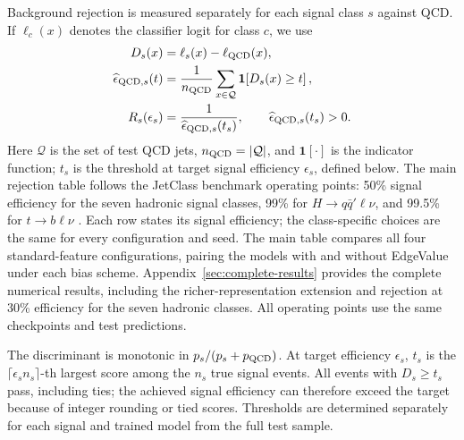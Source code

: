 Background rejection is measured separately for each signal class $s$ against
QCD. If $\ell_c(x)$ denotes the classifier logit for class $c$, we use
\begin{equation}
 \begin{aligned}
 D_s(x)&=\ell_s(x)-\ell_{\mathrm{QCD}}(x),\\
 \widehat\epsilon_{\mathrm{QCD},s}(t)
   &=\frac{1}{n_{\mathrm{QCD}}}\sum_{x\in\mathcal Q}
      \mathbf{1}\!\left[D_s(x)\geq t\right],\\
 R_s(\epsilon_s)&=\frac{1}{\widehat\epsilon_{\mathrm{QCD},s}(t_s)},
 \qquad \widehat\epsilon_{\mathrm{QCD},s}(t_s)>0.
 \end{aligned}
 \label{eq:rejection}
\end{equation}
Here $\mathcal Q$ is the set of test QCD jets, $n_{\mathrm{QCD}}=|\mathcal Q|$,
and $\mathbf{1}[\cdot]$ is the indicator function; $t_s$ is the threshold at
target signal efficiency $\epsilon_s$, defined below.
The main rejection table follows the JetClass benchmark operating points:
50\% signal efficiency for the seven hadronic signal classes, 99\% for
$H\to q\bar q'\ell\nu$, and 99.5\% for $t\to b\ell\nu$
\citep{Qu2022ParticleTransformer}. Each row states its signal efficiency;
the class-specific choices are the same for every configuration and seed.
The main table compares all four standard-feature configurations, pairing
the models with and without EdgeValue under each bias scheme.
Appendix~\ref{sec:complete-results} provides the complete numerical results,
including the richer-representation extension and rejection at 30\%
efficiency for the seven hadronic classes. All operating points use the
same checkpoints and test predictions.

The discriminant is monotonic in $p_s/(p_s+p_{\mathrm{QCD}})$. At target efficiency
$\epsilon_s$, $t_s$ is the
$\lceil\epsilon_s n_s\rceil$-th largest score among the $n_s$ true signal events.
All events with $D_s\geq t_s$ pass, including ties; the achieved signal efficiency
can therefore exceed the target because of integer rounding or tied scores.
Thresholds are determined separately for each signal and trained model from
the full test sample.
